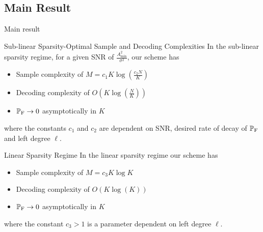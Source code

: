 \documentclass[10pt]{beamer}
\begin{document}
\subsection{Main Result}
\begin{frame}{Main result}

\begin{block}{Sub-linear Sparsity-Optimal Sample and Decoding Complexities}
In the sub-linear sparsity regime, for a given SNR of $\frac{A^{2}_{\text{min}}}{\sigma^{2}}$, our scheme has 
\begin{itemize}
\item Sample complexity of $M=c_1 K\log (\frac{c_2 N}{K})$
\item Decoding complexity of $O\left(K\log(\frac{N}{K})\right)$ 
\item $\mathbb{P}_{\text{F}}\rightarrow 0$ asymptotically in $K$
\end{itemize} 
where the constants $c_{1}$ and $c_{2}$ are dependent on SNR, desired rate of decay of $\mathbb{P}_{\text{F}}$ and left degree $\ell$.
\end{block}
\begin{block}{Linear Sparsity Regime}
In the linear sparsity regime our scheme has 
\begin{itemize}
\item Sample complexity of $M=c_3 K\log K$
\item Decoding complexity of $O\left(K\log(K)\right)$ 
\item $\mathbb{P}_{\text{F}}\rightarrow 0$ asymptotically in $K$
\end{itemize} 
where the constant $c_{3}>1$ is a parameter dependent on left degree $\ell$.
\end{block}
\end{frame}
\end{document}
